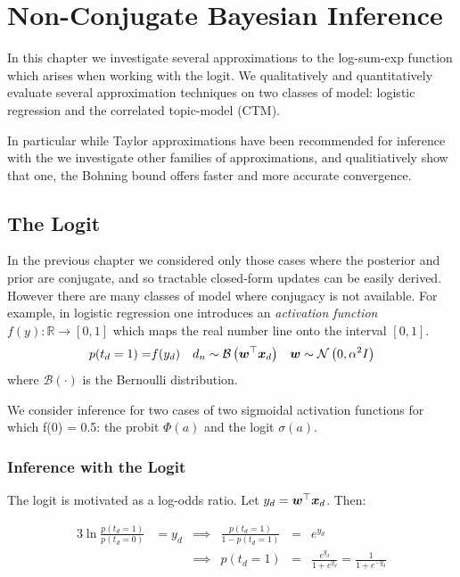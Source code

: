 


\newcommand \xdat { { \mathcal{X} } }
\newcommand \xdoc { { \vv{x}_d } }
\newcommand \xdn { { \vv{x}_{dn} } }

\chapter{Non-Conjugate Bayesian Inference}
\label{sec:nonconj}
In this chapter we investigate several approximations to the log-sum-exp function which arises when working with the logit. We qualitatively and quantitatively evaluate several approximation techniques on two classes of model: logistic regression and the correlated topic-model (CTM).

In particular while Taylor approximations have been recommended for inference with the \cite{Wang2013} we investigate other families of approximations, and qualitiatively show that one, the Bohning bound\cite{Bohning1988} offers faster and more accurate convergence. 
\section{The Logit}
In the previous chapter we considered only those cases where the posterior and prior are conjugate, and so tractable closed-form updates can be easily derived. However there are many classes of model where conjugacy is not available. For example, in logistic regression one introduces an \emph{activation function} $f(y) : \mathbb{R} \rightarrow [0, 1]$ which maps the real number line onto the interval $[0,1]$.
\begin{align*}
p(t_d = 1) = & f(y_d) & d_n  & \sim \mathcal{B} \left( \bm w^\top\bm x_d\right) & \bm w & \sim \mathcal{N} \left( {0}, {\alpha^2 I} \right) \\
\end{align*}
where $\mathcal{B}(\cdot)$ is the Bernoulli distribution.

We consider inference for two cases of two sigmoidal activation functions for which f(0) = 0.5: the probit $\Phi(a)$ and the logit $\sigma(a)$.

\subsection{Inference with the Logit}
The logit is motivated as a log-odds ratio. Let $y_d = \bm w^\top\bm x_d$. Then:

\begin{alignat}{3}
\ln \frac{p(t_d = 1)}{p(t_d = 0)}  & = y_d  &
\implies & \frac{p(t_d = 1)}{1 - p(t_d = 1)}  & = & e^{y_d} \\
& & \implies &  p(t_d = 1)                    & = & \frac{e^{y_d}}{1 + e^{y_d}} = \frac{1}{1+e^{-y_d}}
\end{alignat}

